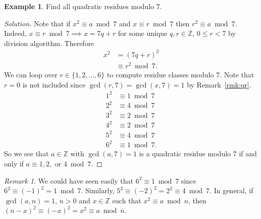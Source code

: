 \documentclass{amsbook}
\theoremstyle{plain}
\theoremstyle{definition}
\newtheorem{example}[theorem]{Example}
\theoremstyle{remark}
\newtheorem{remark}[theorem]{Remark}
\numberwithin{equation}{chapter}
\numberwithin{figure}{chapter}
\newcommand{\Z}{\mathbb{Z}}
\begin{document}
\begin{example}\label{ex:ex1_day17}
  Find all quadratic residues modulo 7.
\end{example}
\begin{proof}[Solution]
  Note that if $x^2 \equiv a \bmod 7$ and $x \equiv r \bmod 7$ then $r^2 \equiv a \bmod 7$. Indeed, $x \equiv r \bmod 7 \implies x = 7q + r$ for some unique $q, r \in \Z$, $0 \leqslant r < 7$ by division algorithm. Therefore
  \begin{align}
    x^2 &= (7q + r)^2 \\
        &\equiv r^2 \bmod 7.
  \end{align}
  We can loop over $r \in \{1, 2, \ldots, 6\}$ to compute residue classes modulo 7. Note that $r = 0$ is not included since $\gcd (r, 7) = \gcd (x, 7) = 1$ by Remark~\ref{rmk:qr}.
  \begin{align}
    1^2 &\equiv 1 \bmod 7 \\
    2^2 &\equiv 4 \bmod 7 \\
    3^2 &\equiv 2 \bmod 7 \\
    4^2 &\equiv 2 \bmod 7 \\
    5^2 &\equiv 4 \bmod 7 \\
    6^2 &\equiv 1 \bmod 7.
  \end{align}
  So we see that $a \in \Z$ with $\gcd (a, 7) = 1$ is a quadratic residue modulo 7 if and only if $a \equiv 1, 2, \text{ or } 4 \bmod 7$.
\end{proof}
\begin{remark}
  We could have seen easily that $6^2 \equiv 1 \bmod 7$ since $6^2 \equiv (-1)^2 = 1 \bmod 7$. Similarly, $5^2 \equiv (-2)^2 = 2^2 \equiv 4 \bmod 7$.
  In general, if $\gcd (a, n) = 1$, $n > 0$ and $x \in \Z$ such that $x^2 \equiv a \bmod n$, then $(n - x)^2 \equiv (-x)^2 = x^2 \equiv a \bmod n$.
\end{remark}
\end{document}
